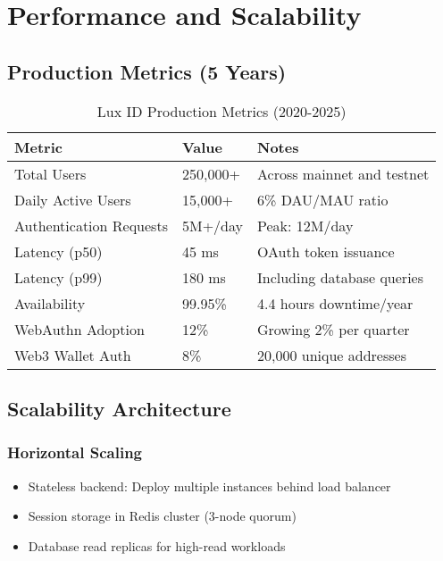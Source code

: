 \documentclass[11pt,a4paper]{article}
\begin{document}
\section{Performance and Scalability}

\subsection{Production Metrics (5 Years)}

\begin{table}[h]
\centering
\begin{tabular}{@{}lll@{}}
\toprule
\textbf{Metric} & \textbf{Value} & \textbf{Notes} \\ \midrule
Total Users & 250,000+ & Across mainnet and testnet \\
Daily Active Users & 15,000+ & 6\% DAU/MAU ratio \\
Authentication Requests & 5M+/day & Peak: 12M/day \\
Latency (p50) & 45 ms & OAuth token issuance \\
Latency (p99) & 180 ms & Including database queries \\
Availability & 99.95\% & 4.4 hours downtime/year \\
WebAuthn Adoption & 12\% & Growing 2\% per quarter \\
Web3 Wallet Auth & 8\% & 20,000 unique addresses \\ \bottomrule
\end{tabular}
\caption{Lux ID Production Metrics (2020-2025)}
\end{table}

\subsection{Scalability Architecture}

\subsubsection{Horizontal Scaling}

\begin{itemize}
  \item Stateless backend: Deploy multiple instances behind load balancer
  \item Session storage in Redis cluster (3-node quorum)
  \item Database read replicas for high-read workloads
\end{itemize}
\end{document}

